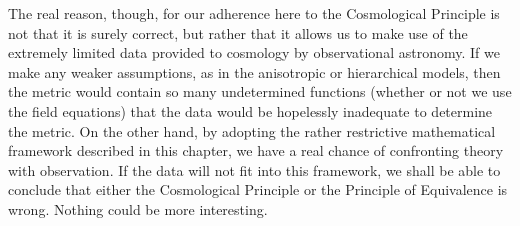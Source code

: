 The real reason, though, for our adherence here to the Cosmological Principle
is not that it is surely correct, but rather that it allows us to make use of
the extremely limited data provided to cosmology by observational astronomy.
If we make any weaker assumptions, as in the anisotropic or hierarchical
models, then the metric would contain so many undetermined functions (whether
or not we use the field equations) that the data would be hopelessly inadequate
to determine the metric. On the other hand, by adopting the rather restrictive
mathematical framework described in this chapter, we have a real chance of
confronting theory with observation. If the data will not fit into this
framework, we shall be able to conclude that either the Cosmological Principle
or the Principle of Equivalence is wrong. Nothing could be more interesting.
